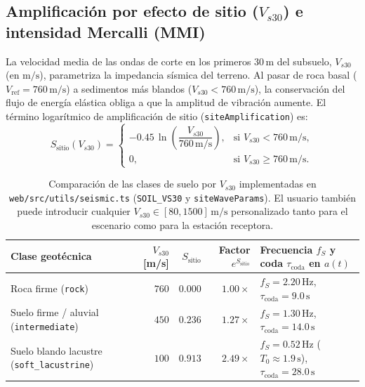 \documentclass[11pt,a4paper]{article}
\newcommand{\src}[1]{\nolinkurl{#1}}
\newcommand{\unit}[1]{\mathrm{#1}}
\begin{document}
\subsection{Amplificación por efecto de sitio (\texorpdfstring{$V_{s30}$}{Vs30}) e intensidad Mercalli (MMI)}
\label{sec:sismo-vs30-mmi}

La velocidad media de las ondas de corte en los primeros $30\,\unit{m}$ del subsuelo, $V_{s30}$ (en
$\unit{m/s}$), parametriza la impedancia sísmica del terreno. Al pasar de roca basal ($V_{\mathrm{ref}} =
760\,\unit{m/s}$) a sedimentos más blandos ($V_{s30} < 760\,\unit{m/s}$), la conservación del flujo de energía
elástica obliga a que la amplitud de vibración aumente. El término logarítmico de amplificación de sitio
(\texttt{siteAmplification}) es:
\begin{equation}
  S_{\mathrm{sitio}}(V_{s30}) =
  \begin{cases}
    -0.45\,\ln\!\left(\dfrac{V_{s30}}{760\,\unit{m/s}}\right), & \text{si } V_{s30} < 760\,\unit{m/s},\\[8pt]
    0, & \text{si } V_{s30} \ge 760\,\unit{m/s}.
  \end{cases}
  \label{eq:amplificacion-vs30}
\end{equation}

\begin{table}[htbp]
\centering\small
\begin{tabularx}{\linewidth}{p{.26\linewidth}rrrX}
\toprule
\textbf{Clase geotécnica} & \textbf{$V_{s30}$ [m/s]} & \textbf{$S_{\mathrm{sitio}}$} & \textbf{Factor $e^{S_{\mathrm{sitio}}}$} & \textbf{Frecuencia $f_S$ y coda $\tau_{\mathrm{coda}}$ en $a(t)$}\\\midrule
Roca firme (\texttt{rock}) & $760$ & $0.000$ & $1.00\times$ & $f_S = 2.20\,\unit{Hz}$, $\tau_{\mathrm{coda}} = 9.0\,\unit{s}$\\
Suelo firme / aluvial (\texttt{intermediate}) & $450$ & $0.236$ & $1.27\times$ & $f_S = 1.30\,\unit{Hz}$, $\tau_{\mathrm{coda}} = 14.0\,\unit{s}$\\
Suelo blando lacustre (\texttt{soft\_lacustrine}) & $100$ & $0.913$ & $2.49\times$ & $f_S = 0.52\,\unit{Hz}$ ($T_0\approx 1.9\,\unit{s}$), $\tau_{\mathrm{coda}} = 28.0\,\unit{s}$\\\bottomrule
\end{tabularx}
\caption{Comparación de las clases de suelo por $V_{s30}$ implementadas en \src{web/src/utils/seismic.ts}
(\texttt{SOIL\_VS30} y \texttt{siteWaveParams}). El usuario también puede introducir cualquier $V_{s30}\in[80,1500]\,\unit{m/s}$
personalizado tanto para el escenario como para la estación receptora.}
\label{tab:comparacion-vs30}
\end{table}
\end{document}
